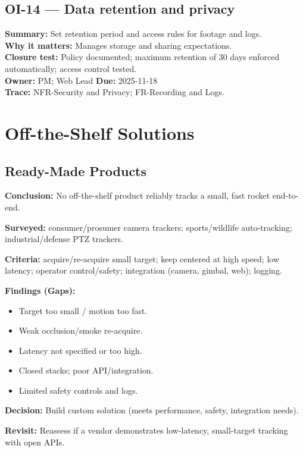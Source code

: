\documentclass[12pt]{article}
\begin{document}
\subsection*{OI-14 — Data retention and privacy}
\textbf{Summary:} Set retention period and access rules for footage and logs.\\
\textbf{Why it matters:} Manages storage and sharing expectations.\\
\textbf{Closure test:} Policy documented; maximum retention of 30 days enforced automatically; access control tested.\\
\textbf{Owner:} PM; Web Lead \quad \textbf{Due:} 2025-11-18\\
\textbf{Trace:} NFR-Security and Privacy; FR-Recording and Logs.

\section{Off-the-Shelf Solutions}
\subsection{Ready-Made Products}
\label{sec:ready-made-products}

\textbf{Conclusion:} No off-the-shelf product reliably tracks a small, fast rocket end-to-end.

\textbf{Surveyed:} consumer/prosumer camera trackers; sports/wildlife auto-tracking; industrial/defense PTZ trackers.

\textbf{Criteria:} acquire/re-acquire small target; keep centered at high speed; low latency; operator control/safety; integration (camera, gimbal, web); logging.

\textbf{Findings (Gaps):}
\begin{itemize}[noitemsep,topsep=2pt]
  \item Target too small / motion too fast.
  \item Weak occlusion/smoke re-acquire.
  \item Latency not specified or too high.
  \item Closed stacks; poor API/integration.
  \item Limited safety controls and logs.
\end{itemize}

\textbf{Decision:} Build custom solution (meets performance, safety, integration needs).

\textbf{Revisit:} Reassess if a vendor demonstrates low-latency, small-target tracking with open APIs.
\end{document}
